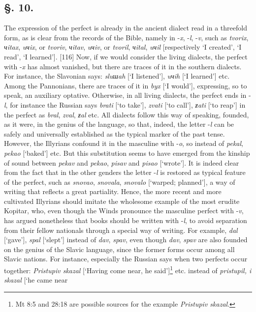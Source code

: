 \subsection*{\hspace*{\fill}§. 10.\hspace*{\fill}}

The expression of the perfect is already in the ancient dialect read in a threefold form, as is clear from the records of the Bible, namely in -\textit{x}, -\textit{l}, -\textit{v}, such as \textit{tvorix}, \textit{чitax}, \textit{uчix}, or \textit{tvoriv}, \textit{чitav}, \textit{uчiv}, or \textit{tvoril}, \textit{чital}, \textit{uчil} [respectively ‘I created’, ‘I read’, ‘I learned’]. [116] Now, if we would consider the living dialects, the perfect with -\textit{x} has almost vanished, but there are traces of it in the southern dialects. For instance, the Slavonian says: \textit{sluшah} [‘I listened’], \textit{uчih} [‘I learned’] etc. Among the Pannonians, there are traces of it in \textit{byx} [‘I would’], expressing, so to speak, an auxiliary optative. Otherwise, in all living dialects, the perfect ends in -\textit{l}, for instance the Russian says \textit{brati} [‘to take’], \textit{zvati} [‘to call’], \textit{ƶati} [‘to reap’] in the perfect as \textit{bral}, \textit{zval}, \textit{ƶal} etc. All dialects follow this way of speaking, founded, as it were, in the genius of the language, so that, indeed, the letter -\textit{l} can be safely and universally established as the typical marker of the past tense. However, the Illyrians confound it in the masculine with -\textit{o}, so instead of \textit{pekal}, \textit{pekao} [‘baked’] etc. But this substitution seems to have emerged from the kinship of sound between \textit{pekav} and \textit{pekao}, \textit{pisav} and \textit{pisao} [‘wrote’]. It is indeed clear from the fact that in the other genders the letter -\textit{l} is restored as typical feature of the perfect, such as \textit{snovao}, \textit{snovala}, \textit{snovalo} [‘warped; planned’], a way of writing that reflects a great partiality. Hence, the more recent and more cultivated Illyrians should imitate the wholesome example of the most erudite Kopitar, who, even though the Winds pronounce the masculine perfect with -\textit{v}, has argued nonetheless that books should be written with -\textit{l}, to avoid separation from their fellow nationals through a special way of writing. For example, \textit{dal} [‘gave’], \textit{spal} [‘slept’] instead of \textit{dav}, \textit{spav}, even though \textit{dav}, \textit{spav} are also founded on the genius of the Slavic language, since the former forms occur among all Slavic nations. For instance, especially the Russian says when two perfects occur together: \textit{Pristupiv skazal} [‘Having come near, he said’]\footnote{Mt 8:5 and 28:18 are possible sources for the example \textit{Pristupiv skazal}.} etc. instead of \textit{pristupil, i skazal} [‘he came near 